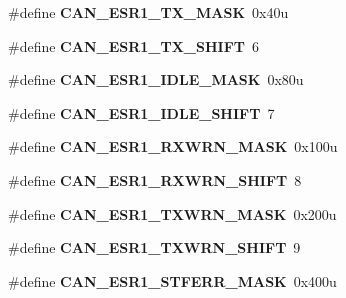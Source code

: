 \begin{DoxyCompactItemize}
\item 
\#define {\bfseries C\+A\+N\+\_\+\+E\+S\+R1\+\_\+\+T\+X\+\_\+\+M\+A\+SK}~0x40u\hypertarget{group__CAN__Register__Masks_ga29052f7ad6fc3da4cbcd9dce8ffa59f5}{}\label{group__CAN__Register__Masks_ga29052f7ad6fc3da4cbcd9dce8ffa59f5}

\item 
\#define {\bfseries C\+A\+N\+\_\+\+E\+S\+R1\+\_\+\+T\+X\+\_\+\+S\+H\+I\+FT}~6\hypertarget{group__CAN__Register__Masks_ga054c570f7af7ef5b09d3d5f5b3edaa3e}{}\label{group__CAN__Register__Masks_ga054c570f7af7ef5b09d3d5f5b3edaa3e}

\item 
\#define {\bfseries C\+A\+N\+\_\+\+E\+S\+R1\+\_\+\+I\+D\+L\+E\+\_\+\+M\+A\+SK}~0x80u\hypertarget{group__CAN__Register__Masks_ga68402932c750edd9ad719585c3be03d2}{}\label{group__CAN__Register__Masks_ga68402932c750edd9ad719585c3be03d2}

\item 
\#define {\bfseries C\+A\+N\+\_\+\+E\+S\+R1\+\_\+\+I\+D\+L\+E\+\_\+\+S\+H\+I\+FT}~7\hypertarget{group__CAN__Register__Masks_ga1eccf60cd0f2bf9a3a426f1ff05f8869}{}\label{group__CAN__Register__Masks_ga1eccf60cd0f2bf9a3a426f1ff05f8869}

\item 
\#define {\bfseries C\+A\+N\+\_\+\+E\+S\+R1\+\_\+\+R\+X\+W\+R\+N\+\_\+\+M\+A\+SK}~0x100u\hypertarget{group__CAN__Register__Masks_ga805a12fba10c76a26fddedeb8634bbe6}{}\label{group__CAN__Register__Masks_ga805a12fba10c76a26fddedeb8634bbe6}

\item 
\#define {\bfseries C\+A\+N\+\_\+\+E\+S\+R1\+\_\+\+R\+X\+W\+R\+N\+\_\+\+S\+H\+I\+FT}~8\hypertarget{group__CAN__Register__Masks_ga879a6ef8506f66a73cfc185d6814ee4e}{}\label{group__CAN__Register__Masks_ga879a6ef8506f66a73cfc185d6814ee4e}

\item 
\#define {\bfseries C\+A\+N\+\_\+\+E\+S\+R1\+\_\+\+T\+X\+W\+R\+N\+\_\+\+M\+A\+SK}~0x200u\hypertarget{group__CAN__Register__Masks_ga62d716c6701375e3106853152e62a312}{}\label{group__CAN__Register__Masks_ga62d716c6701375e3106853152e62a312}

\item 
\#define {\bfseries C\+A\+N\+\_\+\+E\+S\+R1\+\_\+\+T\+X\+W\+R\+N\+\_\+\+S\+H\+I\+FT}~9\hypertarget{group__CAN__Register__Masks_ga62114b41b2b2c5fb95cedde48d06d361}{}\label{group__CAN__Register__Masks_ga62114b41b2b2c5fb95cedde48d06d361}

\item 
\#define {\bfseries C\+A\+N\+\_\+\+E\+S\+R1\+\_\+\+S\+T\+F\+E\+R\+R\+\_\+\+M\+A\+SK}~0x400u\hypertarget{group__CAN__Register__Masks_ga8af394ab6bb4356bc5fa71e2278332ad}{}\label{group__CAN__Register__Masks_ga8af394ab6bb4356bc5fa71e2278332ad}


\end{DoxyCompactItemize}
